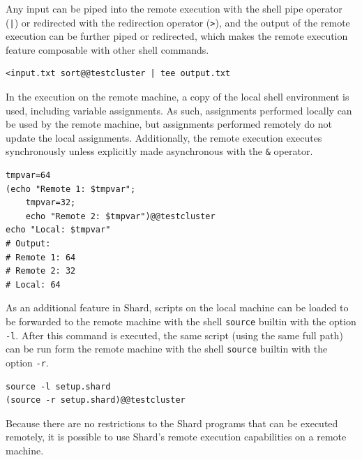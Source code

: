 \documentclass[oneside]{report}
\begin{document}
Any input can be piped into the remote execution with the shell pipe operator (\texttt{|}) or redirected with the redirection operator (\texttt{>}), and the output of the remote execution can be further piped or redirected, which makes the remote execution feature composable with other shell commands.

\begin{minipage}[c]{\textwidth-15pt}
  \begin{lstlisting}[language=Shard]
<input.txt sort@@testcluster | tee output.txt
\end{lstlisting}
  \smallskip
\end{minipage}

In the execution on the remote machine, a copy of the local shell environment is used, including variable assignments.
As such, assignments performed locally can be used by the remote machine, but assignments performed remotely do not update the local assignments.
Additionally, the remote execution executes synchronously unless explicitly made asynchronous with the \texttt{\&} operator.

\begin{minipage}[c]{\textwidth-15pt}
  \begin{lstlisting}[language=Shard]
tmpvar=64
(echo "Remote 1: $tmpvar";
    tmpvar=32;
    echo "Remote 2: $tmpvar")@@testcluster
echo "Local: $tmpvar"
# Output:
# Remote 1: 64
# Remote 2: 32
# Local: 64
\end{lstlisting}
  \smallskip
\end{minipage}

As an additional feature in Shard, scripts on the local machine can be loaded to be forwarded to the remote machine with the shell \texttt{source} builtin with the option \texttt{-l}.
After this command is executed, the same script (using the same full path) can be run form the remote machine with the shell \texttt{source} builtin with the option \texttt{-r}.

\begin{minipage}[c]{\textwidth-15pt}
  \begin{lstlisting}[language=Shard]
source -l setup.shard
(source -r setup.shard)@@testcluster
\end{lstlisting}
  \smallskip
\end{minipage}

Because there are no restrictions to the Shard programs that can be executed remotely, it is possible to use Shard's remote execution capabilities on a remote machine.
\end{document}

